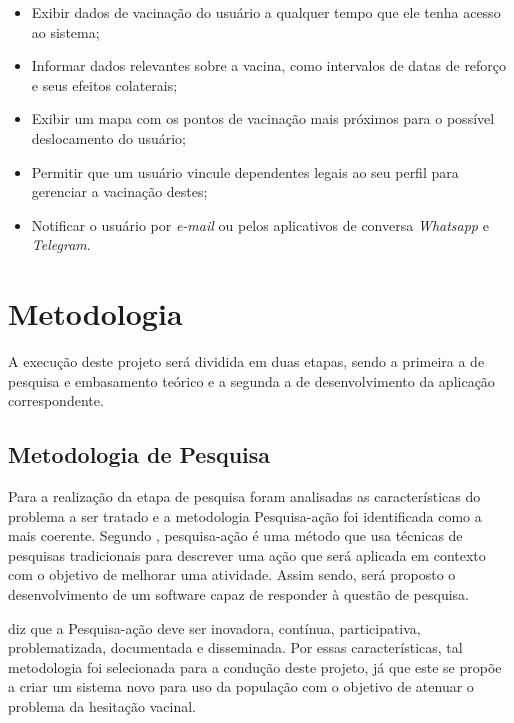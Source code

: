         \begin{itemize}
            \item Exibir dados de vacinação do usuário a qualquer tempo que ele tenha acesso ao sistema;
            \item Informar dados relevantes sobre a vacina, como intervalos de datas de reforço e seus efeitos colaterais;
            \item Exibir um mapa com os pontos de vacinação mais próximos para o possível deslocamento do usuário;
            \item Permitir que um usuário vincule dependentes legais ao seu perfil para gerenciar a vacinação destes;
            \item Notificar o usuário  por \textit{e-mail} ou pelos aplicativos de conversa \textit{Whatsapp} e \textit{Telegram}.

        \end{itemize}

\section{Metodologia}
    A execução deste projeto será dividida em duas etapas, sendo a primeira a de pesquisa e embasamento teórico e a segunda a de desenvolvimento da aplicação correspondente.
    
    \subsection{Metodologia de Pesquisa}
        Para a realização da etapa de pesquisa foram analisadas as características do problema a ser tratado e a metodologia Pesquisa-ação foi identificada como a mais coerente. Segundo \cite{tripp_pesquisa-cao_2005}, pesquisa-ação é uma método que usa técnicas de pesquisas tradicionais para descrever uma ação que será aplicada em contexto com o objetivo de melhorar uma atividade. Assim sendo, será proposto o desenvolvimento de um software capaz de responder à questão de pesquisa.
        
        \cite{tripp_pesquisa-cao_2005} diz que a Pesquisa-ação deve ser inovadora, contínua, participativa, problematizada, documentada e disseminada. Por essas características, tal metodologia foi selecionada para a condução deste projeto, já que este se propõe a criar um sistema novo para uso da população com o objetivo de atenuar o problema da hesitação vacinal.
    
